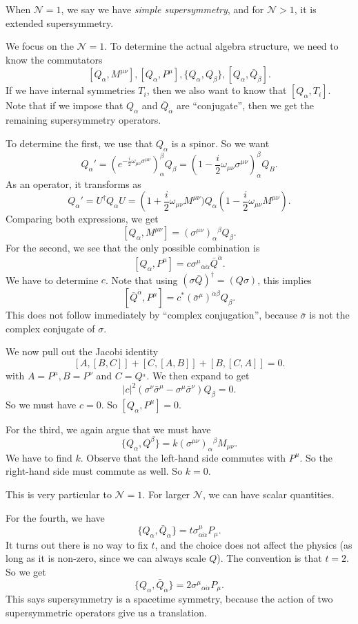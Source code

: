 \documentclass[a4paper]{article}
\begin{document}
When $\mathcal{N} = 1$, we say we have \emph{simple supersymmetry}, and for $\mathcal{N} > 1$, it is extended supersymmetry.

We focus on the $\mathcal{N} = 1$. To determine the actual algebra structure, we need to know the commutators
\[
  [Q_\alpha, M^{\mu\nu}], [Q_\alpha, P^\mu], \{Q_\alpha, Q_\beta\}, [Q_\alpha, \bar{Q}_{\dot{\beta}}].
\]
If we have internal symmetries $T_i$, then we also want to know that $[Q_\alpha, T_i]$. Note that if we impose that $Q_\alpha$ and $\bar{Q}_{\dot{\alpha}}$ are ``conjugate'', then we get the remaining supersymmetry operators.

To determine the first, we use that $Q_\alpha$ is a spinor. So we want
\[
  Q_\alpha' = (e^{-\frac{i}{2} \omega_{\mu\nu} \sigma^{\mu\nu}})_\alpha^\beta Q_\beta = \left(1 - \frac{i}{2} \omega_{\mu\nu} \sigma^{\mu\nu}\right)_\alpha^\beta Q_B.
\]
As an operator, it transforms as
\[
  Q_\alpha' = U^\dagger Q_\alpha U = \left(1 + \frac{i}{2} \omega_{\mu\nu} M^{\mu\nu}) Q_\alpha \left(1 - \frac{i}{2} \omega_{\mu\nu} M^{\mu\nu}\right).
\]
Comparing both expressions, we get
\[
  [Q_\alpha, M^{\mu\nu}] = (\sigma^{\mu\nu})_\alpha\!^\beta Q_\beta.
\]
For the second, we see that the only possible combination is
\[
  [Q_\alpha, P^\mu] = c \sigma^\mu\!_{\alpha \dot{\alpha}} \bar{Q}^{\dot{\alpha}}.
\]
We have to determine $c$. Note that using $(\sigma \bar{Q})^\dagger = (Q\sigma)$, this implies
\[
  [\bar{Q}^{\dot{\alpha}}, P^\mu] = c^* (\bar{\sigma}^\mu)^{\dot{\alpha} \beta} Q_\beta.
\]
This does not follow immediately by ``complex conjugation'', because $\bar{\sigma}$ is not the complex conjugate of $\sigma$.

We now pull out the Jacobi identity
\[
  [A, [B, C]] + [C, [A, B]] + [B, [C, A]] = 0.
\]
with $A = P^\mu, B = P^\nu$ and $C = Q^_\alpha$. We then expand to get
\[
  |c|^2 (\sigma^\nu \bar{\sigma}^\mu - \sigma^\mu \bar{\sigma}^\nu) Q_\beta = 0.
\]
So we must have $c = 0$. So $[Q_\alpha, P^\mu] = 0$.

For the third, we again argue that we must have
\[
  \{Q_\alpha, Q^\beta\} = k (\sigma^{\mu\nu})_\alpha\!^\beta M_{\mu\nu}. %
\]
We have to find $k$. Observe that the left-hand side commutes with $P^\mu$. So the right-hand side must commute as well. So $k = 0$.

This is very particular to $\mathcal{N} = 1$. For larger $\mathcal{N}$, we can have scalar quantities.

For the fourth, we have
\[
  \{Q_\alpha, \bar{Q}_{\dot{\alpha}}\} = t \sigma^\mu_{\alpha \dot{\alpha}} P_\mu.
\]
It turns out there is no way to fix $t$, and the choice does not affect the physics (as long as it is non-zero, since we can always scale $Q$). The convention is that $t = 2$. So we get
\[
  \{Q_\alpha, \bar{Q}_{\dot{\alpha}}\} = 2 \sigma^\mu\!_{\alpha \dot{\alpha}} P_\mu.
\]
This says supersymmetry is a spacetime symmetry, because the action of two supersymmetric operators give us a translation.
\end{document}
